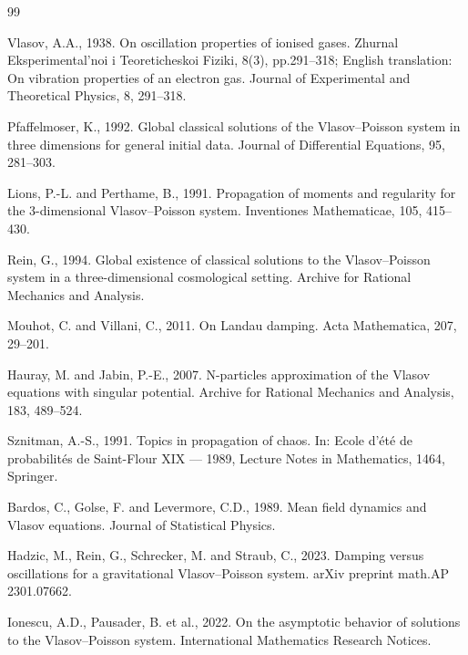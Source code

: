 \documentclass[12pt,a4paper]{article}
\numberwithin{equation}{section}
\begin{document}
\newpage
\begin{thebibliography}{99}

\item Vlasov, A.A., 1938. On oscillation properties of ionised gases. Zhurnal Eksperimental’noi i Teoreticheskoi Fiziki, 8(3), pp.291–318; English translation: On vibration properties of an electron gas. Journal of Experimental and Theoretical Physics, 8, 291–318.

\item Pfaffelmoser, K., 1992. Global classical solutions of the Vlasov–Poisson system in three dimensions for general initial data. Journal of Differential Equations, 95, 281–303.

\item Lions, P.-L. and Perthame, B., 1991. Propagation of moments and regularity for the 3-dimensional Vlasov–Poisson system. Inventiones Mathematicae, 105, 415–430.

\item Rein, G., 1994. Global existence of classical solutions to the Vlasov–Poisson system in a three-dimensional cosmological setting. Archive for Rational Mechanics and Analysis.

\item Mouhot, C. and Villani, C., 2011. On Landau damping. Acta Mathematica, 207, 29–201.

\item Hauray, M. and Jabin, P.-E., 2007. N-particles approximation of the Vlasov equations with singular potential. Archive for Rational Mechanics and Analysis, 183, 489–524.

\item Sznitman, A.-S., 1991. Topics in propagation of chaos. In: Ecole d’été de probabilités de Saint-Flour XIX — 1989, Lecture Notes in Mathematics, 1464, Springer.

\item Bardos, C., Golse, F. and Levermore, C.D., 1989. Mean field dynamics and Vlasov equations. Journal of Statistical Physics.

\item Hadzic, M., Rein, G., Schrecker, M. and Straub, C., 2023. Damping versus oscillations for a gravitational Vlasov–Poisson system. arXiv preprint math.AP 2301.07662.

\item Ionescu, A.D., Pausader, B. et al., 2022. On the asymptotic behavior of solutions to the Vlasov–Poisson system. International Mathematics Research Notices.


\end{thebibliography}
\end{document}
